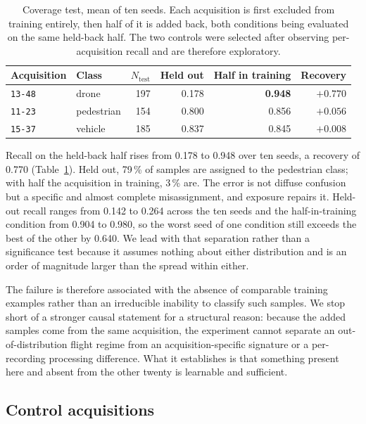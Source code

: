 \documentclass[11pt,a4paper]{article}
\newcommand{\s}[1]{\texttt{#1}}            %
\newcommand{\tgt}{\s{13-48}}               %
\begin{document}
\begin{table}[!htbp]
\caption{Coverage test, mean of ten seeds. Each acquisition is first excluded
from training entirely, then half of it is added back, both conditions being
evaluated on the same held-back half. The two controls were selected after
observing per-acquisition recall and are therefore exploratory.}
\label{tab:coverage}
\centering
\small
\begin{tabular}{@{}llrrrr@{}}
\toprule
Acquisition & Class & $N_{\mathrm{test}}$ & Held out & Half in training & Recovery \\
\midrule
\tgt{}   & drone      & 197 & 0.178 & \textbf{0.948} & \textbf{$+0.770$} \\
\s{11-23} & pedestrian & 154 & 0.800 & 0.856          & $+0.056$ \\
\s{15-37} & vehicle    & 185 & 0.837 & 0.845          & $+0.008$ \\
\bottomrule
\end{tabular}
\end{table}

Recall on the held-back half rises from 0.178 to 0.948 over ten seeds, a recovery of 0.770 (Table~\ref{tab:coverage}). Held out, 79\,\% of samples are assigned to the pedestrian class; with half the acquisition in training, 3\,\% are. The error is not diffuse confusion but a specific and almost complete misassignment, and exposure repairs it. Held-out recall ranges from 0.142 to 0.264 across the ten seeds and the half-in-training condition from 0.904 to 0.980, so the worst seed of one condition still exceeds the best of the other by 0.640. We lead with that separation rather than a significance test because it assumes nothing about either distribution and is an order of magnitude larger than the spread within either.

The failure is therefore associated with the absence of comparable training examples rather than an irreducible inability to classify such samples. We stop short of a stronger causal statement for a structural reason: because the added samples come from the same acquisition, the experiment cannot separate an out-of-distribution flight regime from an acquisition-specific signature or a per-recording processing difference. What it establishes is that something present here and absent from the other twenty is learnable and sufficient.

\subsection{Control acquisitions}
\label{sec:controls}
\end{document}

